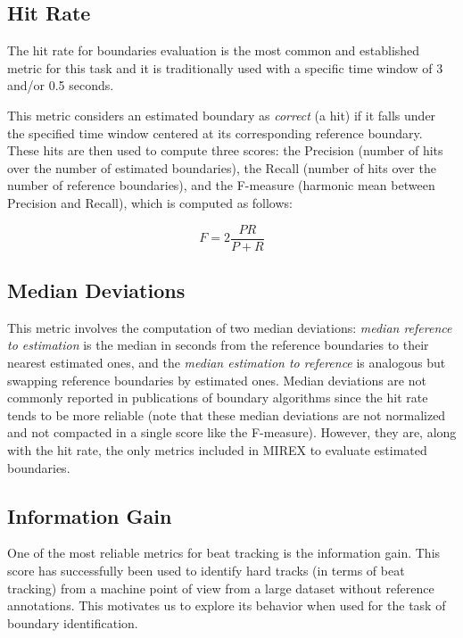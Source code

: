 \documentclass{article}
\begin{document}
\subsection{Hit Rate}\label{subsec:hitrate}

The hit rate for boundaries evaluation is the most common and established metric for this task and it is traditionally used with a specific time window of 3 and/or 0.5 seconds\cite{Ong2005}. 

This metric considers an estimated boundary as \emph{correct} (a hit) if it falls under the specified time window centered at its corresponding reference boundary.
These hits are then used to compute three scores: the Precision (number of hits over the number of estimated boundaries), the Recall (number of hits over the number of reference boundaries), and the F-measure (harmonic mean between Precision and Recall), which is computed as follows:

\begin{equation}
  F = 2 \frac{P R}{P + R}
\end{equation}

\subsection{Median Deviations}

This metric involves the computation of two median deviations: \emph{median reference to estimation} is the median in seconds from the reference boundaries to their nearest estimated ones, and the \emph{median estimation to reference} is analogous but swapping reference boundaries by estimated ones\cite{Pampalk}.
Median deviations are not commonly reported in publications of boundary algorithms since the hit rate tends to be more reliable (note that these median deviations are not normalized and not compacted in a single score like the F-measure).
However, they are, along with the hit rate, the only metrics included in MIREX to evaluate estimated boundaries.

\subsection{Information Gain}

One of the most reliable metrics for beat tracking is the information gain\cite{Davies2009}. 
This score has successfully been used to identify hard tracks (in terms of beat tracking) from a machine point of view from a large dataset without reference annotations\cite{Holzapfel2012}.
This motivates us to explore its behavior when used for the task of boundary identification.
\end{document}
